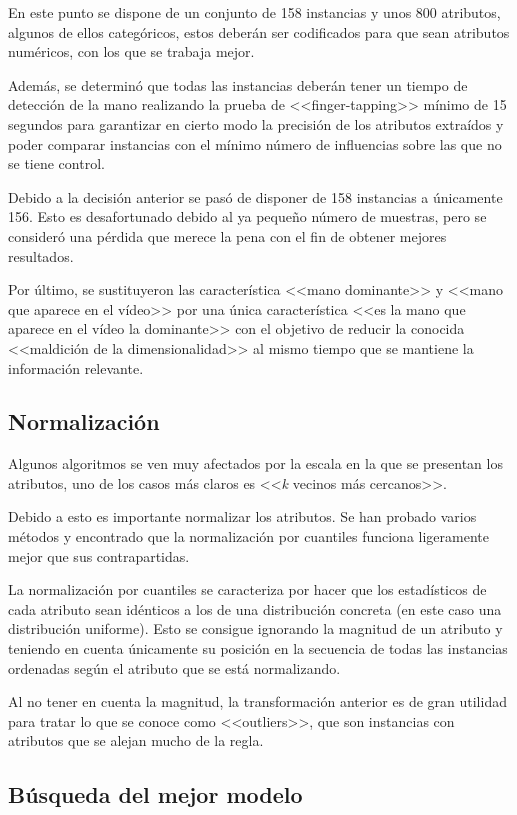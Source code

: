 En este punto se dispone de un conjunto de 158 instancias y unos 800 atributos,
algunos de ellos categóricos, estos deberán ser codificados para que sean
atributos numéricos, con los que se trabaja mejor.

Además, se determinó que todas las instancias deberán tener un tiempo de
detección de la mano realizando la prueba de <<finger-tapping>> mínimo de 15
segundos para garantizar en cierto modo la precisión de los atributos extraídos
y poder comparar instancias con el mínimo número de influencias sobre las que no
se tiene control.

Debido a la decisión anterior se pasó de disponer de 158 instancias a únicamente
156. Esto es desafortunado debido al ya pequeño número de muestras, pero se
consideró una pérdida que merece la pena con el fin de obtener mejores
resultados.

Por último, se sustituyeron las característica <<mano dominante>> y <<mano que
aparece en el vídeo>> por una única característica <<es la mano que aparece en
el vídeo la dominante>> con el objetivo de reducir la conocida <<maldición de la
dimensionalidad>> al mismo tiempo que se mantiene la información relevante.

\subsection{Normalización}

Algunos algoritmos se ven muy afectados por la escala en la que se presentan los
atributos, uno de los casos más claros es <<\textit{k} vecinos más cercanos>>.

Debido a esto es importante normalizar los atributos. Se han probado varios
métodos y encontrado que la normalización por cuantiles funciona ligeramente
mejor que sus contrapartidas.

La normalización por cuantiles se caracteriza por hacer que los estadísticos de
cada atributo sean idénticos a los de una distribución concreta (en este caso
una distribución uniforme). Esto se consigue ignorando la magnitud de un
atributo y teniendo en cuenta únicamente su posición en la secuencia de todas
las instancias ordenadas según el atributo que se está normalizando.

Al no tener en cuenta la magnitud, la transformación anterior es de gran
utilidad para tratar lo que se conoce como <<outliers>>, que son instancias con
atributos que se alejan mucho de la regla.

\subsection{Búsqueda del mejor modelo}

